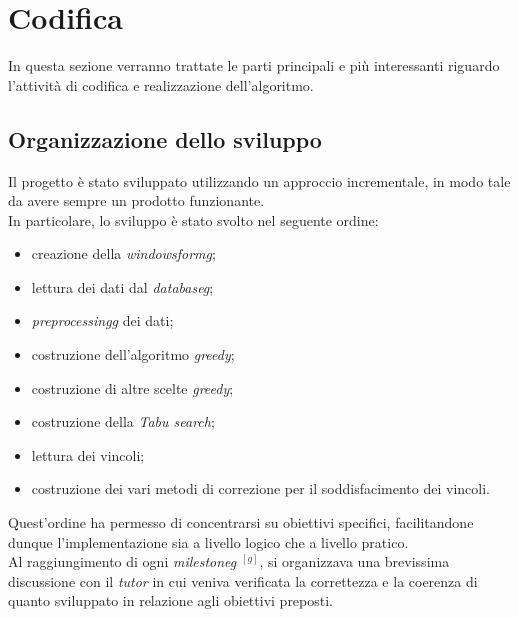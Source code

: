 \section{Codifica}
\label{sec:codifica}
\noindent In questa sezione verranno trattate le parti principali e più interessanti riguardo l'attività
di codifica e realizzazione dell'algoritmo.

\subsection{Organizzazione dello sviluppo}
\label{sec:organizzazione-sviluppo}
\noindent Il progetto è stato sviluppato utilizzando
un approccio incrementale, in modo tale da avere
sempre un prodotto funzionante.\\
In particolare, lo sviluppo è stato svolto nel seguente ordine:
\begin{itemize}
    \item creazione della \textit{\gls{windowsformg}};
    \item lettura dei dati dal \textit{\gls{databaseg}};
    \item \textit{\gls{preprocessingg}} dei dati;
    \item costruzione dell'algoritmo \textit{greedy};
    \item costruzione di altre scelte \textit{greedy};
    \item costruzione della \textit{Tabu search};
    \item lettura dei vincoli;
    \item costruzione dei vari metodi di correzione
    per il soddisfacimento dei vincoli.
\end{itemize}

\noindent Quest'ordine ha permesso di concentrarsi su obiettivi specifici,
facilitandone dunque l'implementazione sia a livello logico che a livello pratico.\\

\noindent Al raggiungimento di ogni \textit{\gls{milestoneg}} $^{[g]}$, si
organizzava una brevissima discussione con il \textit{tutor}
in cui veniva verificata la correttezza e la coerenza di quanto
sviluppato in relazione agli obiettivi preposti.
